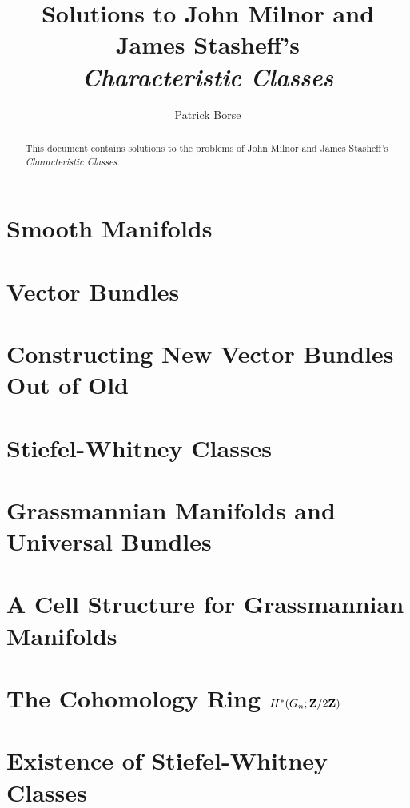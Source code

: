 \documentclass[oneside]{amsbook}
\title{Solutions to John Milnor and James Stasheff's\\ \emph{Characteristic Classes}}
\author{Patrick Borse}
\numberwithin{prob}{chapter}
\begin{document}
\begin{abstract}
This document contains solutions to the problems of John Milnor and James Stasheff's \emph{Characteristic Classes}. 
\end{abstract}

\maketitle

\tableofcontents

\chapter{Smooth Manifolds}


\chapter{Vector Bundles}


\chapter{Constructing New Vector Bundles Out of Old}


\chapter{Stiefel-Whitney Classes}


\chapter{Grassmannian Manifolds and Universal Bundles}


\chapter{A Cell Structure for Grassmannian Manifolds}


\chapter{The Cohomology Ring $H^*(G_n; \mathbf{Z}/2\mathbf{Z})$}


\chapter{Existence of Stiefel-Whitney Classes}

\end{document}
